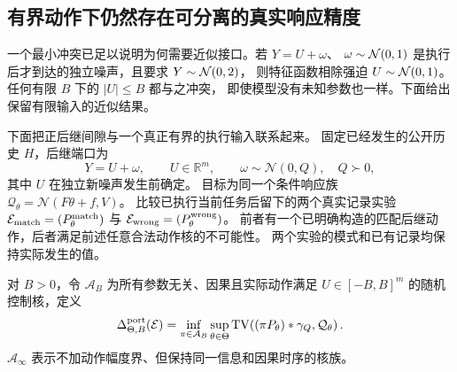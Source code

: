 \documentclass[UTF8,fontset=fandol,zihao=5,a4paper]{ctexart}
\theoremstyle{definition}
\theoremstyle{remark}\newtheorem{remark}[theorem]{说明}
\numberwithin{equation}{section}
\begin{document}

\subsection{有界动作下仍然存在可分离的真实响应精度}
一个最小冲突已足以说明为何需要近似接口。若 $Y=U+\omega$、
$\omega\sim\mathcal N(0,1)$ 是执行后才到达的独立噪声，且要求 $Y\sim\mathcal N(0,2)$，
则特征函数相除强迫 $U\sim\mathcal N(0,1)$。任何有限 $B$ 下的 $|U|\le B$ 都与之冲突，
即使模型没有未知参数也一样。下面给出保留有限输入的近似结果。

\label{sec:bounded-port-gap}

下面把正后继间隙与一个真正有界的执行输入联系起来。
固定已经发生的公开历史 $H$，后继端口为
\begin{equation}
 Y=U+\omega,\qquad U\in\mathbb R^m,\qquad
 \omega\sim\mathcal N(0,Q),\quad Q\succ0,
 \label{eq:bounded-gap-port}
\end{equation}
其中 $U$ 在独立新噪声发生前确定。
目标为同一个条件响应族
$\mathcal Q_\theta=\mathcal N(F\theta+f,V)$。
比较已执行当前任务后留下的两个真实记录实验
$\mathcal E_{\rm match}=(P_\theta^{\rm match})$
与 $\mathcal E_{\rm wrong}=(P_\theta^{\rm wrong})$。
前者有一个已明确构造的匹配后继动作，后者满足前述任意合法动作核的不可能性。
两个实验的模式和已有记录均保持实际发生的值。

对 $B>0$，令 $\mathcal A_B$ 为所有参数无关、因果且实际动作满足
$U\in[-B,B]^m$ 的随机控制核，定义
\begin{equation}
 \Delta_{\Theta,B}^{\rm port}(\mathcal E)
 =\inf_{\pi\in\mathcal A_B}\sup_{\theta\in\Theta}
 \operatorname{TV}\!\left((\pi P_\theta)*\gamma_Q,
                         \mathcal Q_\theta\right).
 \label{eq:bounded-gap-deficiency}
\end{equation}
$\mathcal A_\infty$ 表示不加动作幅度界、但保持同一信息和因果时序的核族。
\end{document}
